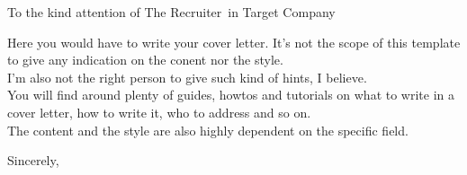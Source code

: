 \documentclass[a4paper]{letter}
\def\company{Target Company}
\def\recruiter{The Recruiter}
\def\companyaddress{Somestreet, 1 \newline 0000 City \newline Country}
\begin{document}
  \begin{letter}{}

  \opening{To the kind attention of \recruiter ~in \company}

  Here you would have to write your cover letter. It's not the scope of this template to give any indication on the conent nor the style.\\
  I'm also not the right person to give such kind of hints, I believe.\\
  You will find around plenty of guides, howtos and tutorials on what to write in a cover letter, how to write it, who to address and so on.\\
  The content and the style are also highly dependent on the specific field.\\

  \closing{Sincerely,}

  \end{letter}
\end{document}
